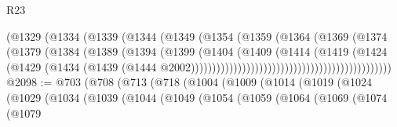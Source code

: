 \begin{lexlean}{R23}
\begin{coremodule}
                                                  (@1329
                                                    (@1334
                                                      (@1339
                                                        (@1344
                                                          (@1349
                                                            (@1354
                                                              (@1359
                                                                (@1364
                                                                  (@1369
                                                                    (@1374
                                                                      (@1379
                                                                        (@1384
                                                                          (@1389
                                                                            (@1394
                                                                              (@1399
                                                                                (@1404
                                                                                  (@1409
                                                                                    (@1414
                                                                                      (@1419
                                                                                        (@1424
                                                                                          (@1429
                                                                                            (@1434
                                                                                              (@1439
                                                                                                (@1444
                                                                                                  @2002)))))))))))))))))))))))))))))))))))))))))))))))
@2098 := @703
    (@708
      (@713
        (@718
          (@1004
            (@1009
              (@1014
                (@1019
                  (@1024
                    (@1029
                      (@1034
                        (@1039
                          (@1044
                            (@1049
                              (@1054
                                (@1059
                                  (@1064
                                    (@1069
                                      (@1074
                                        (@1079

\end{coremodule}
\end{lexlean}
